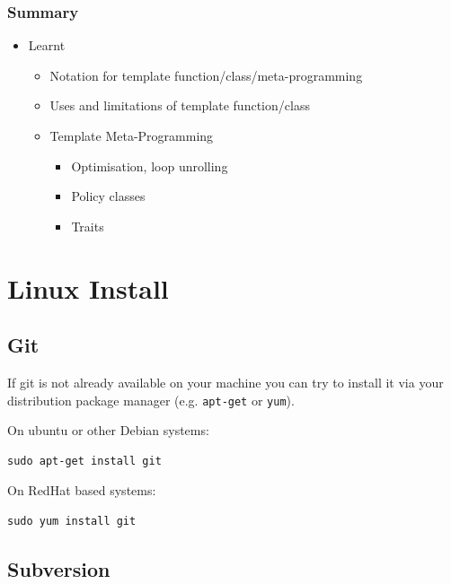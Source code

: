\subsubsection{Summary}\label{summary-4}

\begin{itemize}
\itemsep1pt\parskip0pt
\item
  Learnt

  \begin{itemize}
  \itemsep1pt\parskip0pt
  \item
    Notation for template function/class/meta-programming
  \item
    Uses and limitations of template function/class
  \item
    Template Meta-Programming

    \begin{itemize}
    \itemsep1pt\parskip0pt
    \item
      Optimisation, loop unrolling
    \item
      Policy classes
    \item
      Traits
    \end{itemize}
  \end{itemize}
\end{itemize}

\section{Linux Install}\label{linux-install}

\subsection{Git}\label{git-1}

If git is not already available on your machine you can try to install
it via your distribution package manager (e.g. \texttt{apt-get} or
\texttt{yum}).

On ubuntu or other Debian systems:

\begin{verbatim}
sudo apt-get install git
\end{verbatim}

On RedHat based systems:

\begin{verbatim}
sudo yum install git
\end{verbatim}

\subsection{Subversion}\label{subversion}

